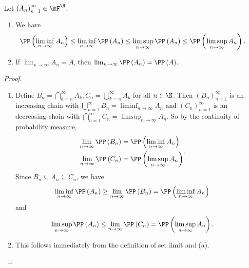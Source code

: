 \documentclass[stat901]{subfiles}
\begin{document}
    \clearpage
    \begin{theorem}{}
        Let $\left( A_{n} \right)^{\infty}_{n=1}\in\mF^{\N}$.
        \begin{enumerate}
            \item We have
                \begin{equation*}
                    \PP\left( \liminf_{n\to\infty}A_n \right) \leq \liminf_{n\to\infty}\PP\left( A_n \right)\leq\limsup_{n\to\infty}\PP\left( A_n \right)\leq\PP\left( \limsup_{n\to\infty}A_n \right).
                \end{equation*}
            \item If $\lim_{n\to\infty}A_n = A$, then $\lim_{n\to\infty}\PP\left( A_n \right)=\PP\left( A \right)$.
        \end{enumerate}
    \end{theorem}

    \begin{proof}
        \begin{enumerate}
            \item Define $B_n = \bigcap^{\infty}_{k=n} A_k, C_n = \bigcup^{\infty}_{k=n} A_k$ for all $n\in\N$. Then $\left( B_{n} \right)^{\infty}_{n=1}$ is an increasing chain with $\bigcup^{\infty}_{n=1} B_n = \liminf_{n\to\infty} A_n$ and $\left( C_{n} \right)^{\infty}_{n=1}$ is an decreasing chain with $\bigcap^{\infty}_{n=1} C_n = \limsup_{n\to\infty} A_n$. So by the continuity of probability measure,
                \begin{equation*}
                    \begin{aligned}
                        \lim_{n\to\infty}\PP\left( B_n \right) & = \PP\left( \liminf_{n\to\infty}A_n \right) \\
                        \lim_{n\to\infty}\PP\left( C_n \right) & = \PP\left( \limsup_{n\to\infty}A_n \right) \\
                    \end{aligned} .
                \end{equation*}
                Since $B_n\subseteq A_n\subseteq C_n$, we have
                \begin{equation*}
                    \liminf_{n\to\infty}\PP\left( A_n \right) \geq \lim_{n\to\infty} \PP\left( B_n \right) = \PP\left( \liminf_{n\to\infty}A_n \right) 
                \end{equation*}
                and
                \begin{equation*}
                    \limsup_{n\to\infty}\PP\left( A_n \right)\leq\lim_{n\to\infty}\PP\left( C_n \right) = \PP\left( \limsup_{n\to\infty}A_n \right).
                \end{equation*}

            \item This follows immediately from the definition of set limit and (a).
        \end{enumerate}
    \end{proof}
    
\end{document}
